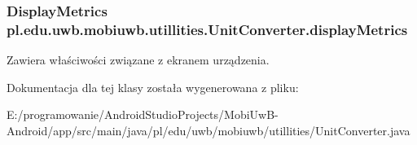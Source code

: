 \subsubsection[{display\+Metrics}]{\setlength{\rightskip}{0pt plus 5cm}Display\+Metrics pl.\+edu.\+uwb.\+mobiuwb.\+utillities.\+Unit\+Converter.\+display\+Metrics\hspace{0.3cm}{\ttfamily [static]}}\label{classpl_1_1edu_1_1uwb_1_1mobiuwb_1_1utillities_1_1_unit_converter_ae33325b0005ac2d239fc4f7d5943af78}
Zawiera właściwości związane z ekranem urządzenia. 

Dokumentacja dla tej klasy została wygenerowana z pliku\+:\begin{DoxyCompactItemize}
\item 
E\+:/programowanie/\+Android\+Studio\+Projects/\+Mobi\+Uw\+B-\/\+Android/app/src/main/java/pl/edu/uwb/mobiuwb/utillities/Unit\+Converter.\+java\end{DoxyCompactItemize}
